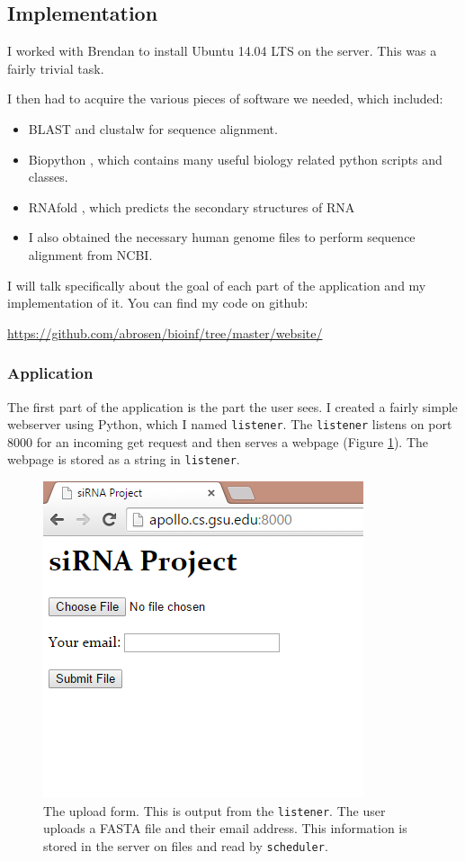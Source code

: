 \documentclass[10pt,letterpaper]{article}
\begin{document}
\subsection{Implementation}
I worked with Brendan to install Ubuntu 14.04 LTS on the server. 
This was a fairly trivial task.

I then had to acquire the various pieces of software we needed, which included:

\begin{itemize}
	\item BLAST \cite{blast} and clustalw \cite{thompson2002multiple} for sequence alignment.
	\item Biopython \cite{cock2009biopython}, which contains many useful biology related python scripts and classes.
	\item RNAfold \cite{lorenz2011viennarna},  which predicts the secondary structures of RNA
	\item I also obtained the necessary human genome files to perform sequence alignment from NCBI.
\end{itemize}

I will talk specifically about the goal of each part of the application and my implementation of it.
You can find my code on github: 

\url{https://github.com/abrosen/bioinf/tree/master/website/}

\subsubsection{Application}
The first part of the application is the part the user sees.
I created a fairly simple webserver using Python, which I named \texttt{listener}.
The \texttt{listener} listens on port 8000 for an incoming get request and then serves a webpage (Figure \ref{fig:website}). 
The webpage is stored as a string in \texttt{listener}.

\begin{figure}
\centering
\includegraphics[width=0.5\linewidth]{website}
\caption{The upload form. This is output from the \texttt{listener}.  
	The user uploads a FASTA file and their email address.
	This information is stored in the server on files and read by \texttt{scheduler}.
	}
\label{fig:website}
\end{figure}
\end{document}

